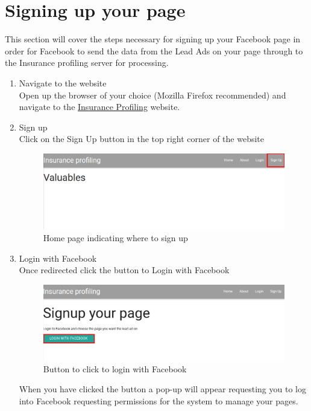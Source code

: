 \documentclass{article}
\begin{document}
	\section{Signing up your page}
		This section will cover the steps necessary for signing up your Facebook page in order for Facebook to send the data from the Lead Ads on your page through to the Insurance profiling server for processing.
		\begin{enumerate}
			\item Navigate to the website\\
			Open up the browser of your choice (Mozilla Firefox recommended) and navigate to the \href{https://insuranceprofiling.herokuapp.com}{Insurance Profiling} website.

			\item Sign up\\
			Click on the Sign Up button in the top right corner of the website\\
			\begin{figure}[H]
			  \centering
			      \includegraphics[width=\textwidth]{images/home_signup.png}
			  \caption{Home page indicating where to sign up}
			  \label{fig:homeSignup}
			\end{figure}

			\item Login with Facebook\\
			Once redirected click the button to Login with Facebook\\
			\begin{figure}[H]
			  \centering
			      \includegraphics[width=\textwidth]{images/signup_login.png}
			  \caption{Button to click to login with Facebook}
			  \label{fig:signupLogin}
			\end{figure}
			When you have clicked the button a pop-up will appear requesting you to log into Facebook requesting permissions for the system to manage your pages.


\end{enumerate}
\end{document}
